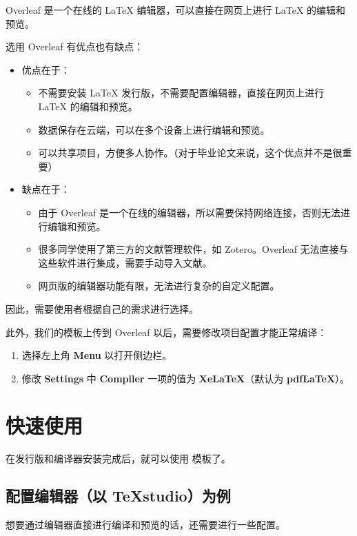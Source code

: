 Overleaf 是一个在线的 \LaTeX{} 编辑器，可以直接在网页上进行 \LaTeX{} 的编辑和预览。

选用 Overleaf 有优点也有缺点：
\begin{itemize}
  \item 优点在于：
    \begin{itemize}
      \item 不需要安装 \LaTeX{} 发行版，不需要配置编辑器，直接在网页上进行 \LaTeX{} 的编辑和预览。
      \item 数据保存在云端，可以在多个设备上进行编辑和预览。
      \item 可以共享项目，方便多人协作。（对于毕业论文来说，这个优点并不是很重要）
    \end{itemize}
  \item 缺点在于：
    \begin{itemize}
      \item 由于 Overleaf 是一个在线的编辑器，所以需要保持网络连接，否则无法进行编辑和预览。
      \item 很多同学使用了第三方的文献管理软件，如 Zotero。Overleaf 无法直接与这些软件进行集成，需要手动导入文献。
      \item 网页版的编辑器功能有限，无法进行复杂的自定义配置。
    \end{itemize}
\end{itemize}

因此，需要使用者根据自己的需求进行选择。

此外，我们的模板上传到 Overleaf 以后，需要修改项目配置才能正常编译：
\begin{enumerate}
  \item 选择左上角 \textbf{Menu} 以打开侧边栏。
  \item 修改 \textbf{Settings} 中 \textbf{Compiler} 一项的值为 \textbf{XeLaTeX}（默认为 \textbf{pdfLaTeX}）。
\end{enumerate}

\section{快速使用}

在发行版和编译器安装完成后，就可以使用 \BIThesis{}模板了。

\subsection{配置编辑器（以 TeXstudio）为例}

想要通过编辑器直接进行编译和预览的话，还需要进行一些配置。

